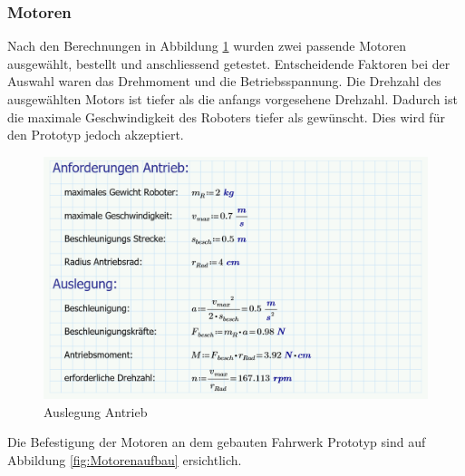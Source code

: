 \subsubsection*{Motoren}


Nach den Berechnungen in Abbildung \ref{fig:Auslegung_Antrieb}  wurden zwei passende Motoren ausgewählt, bestellt und anschliessend getestet. Entscheidende Faktoren bei der Auswahl waren das Drehmoment und die Betriebsspannung. Die Drehzahl des ausgewählten Motors ist tiefer als die anfangs vorgesehene Drehzahl. Dadurch ist die maximale Geschwindigkeit des Roboters tiefer als gewünscht. Dies wird für den Prototyp jedoch akzeptiert.

\begin{figure}[H]
    \centering
    \includegraphics[width=0.8\linewidth]{img/Auslegung_Antrieb.PNG}
    \caption{Auslegung Antrieb}
    \label{fig:Auslegung_Antrieb}
\end{figure}

 Die Befestigung der Motoren an dem gebauten Fahrwerk Prototyp sind auf Abbildung \ref{fig:Motorenaufbau} ersichtlich.

